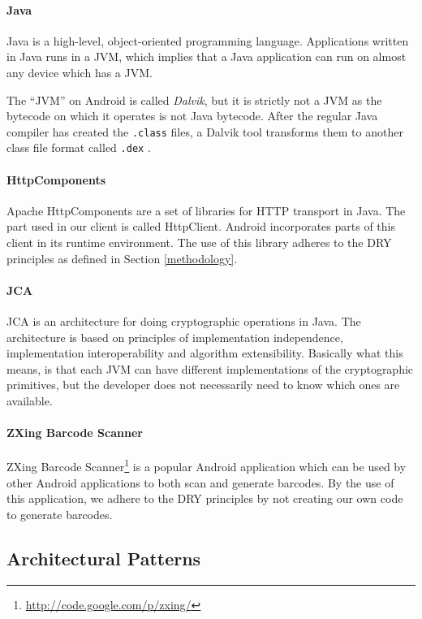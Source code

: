 \documentclass[pdftex,english,10pt,b5paper,twoside]{book}
\begin{document}
\paragraph{Java} Java is a high-level, object-oriented programming language.
Applications written in Java runs in a \ac{JVM}, which implies that a Java
application can run on almost any device which has a \ac{JVM}.

The ``\ac{JVM}'' on Android is called \emph{Dalvik}, but it is strictly not a
\acl{JVM} as the bytecode on which it operates is not Java bytecode.
After the regular Java compiler has created the \texttt{.class} files, a Dalvik
tool transforms them to another class file format called \texttt{.dex}
\cite{dalvik}.

\paragraph{HttpComponents} Apache HttpComponents are a set of libraries for
\ac{HTTP} transport in Java. The part used in our client is called HttpClient.
Android incorporates parts of this client in its runtime environment. The use
of this library adheres to the \ac{DRY} principles as defined in Section
\ref{methodology}.

\paragraph{\ac{JCA}} \ac{JCA} is an architecture for doing cryptographic
operations in Java. The architecture is based on principles of implementation
independence, implementation interoperability and algorithm extensibility.
Basically what this means, is that each \ac{JVM} can have different
implementations of the cryptographic primitives, but the developer does not
necessarily need to know which ones are available.  

\paragraph{ZXing Barcode Scanner} ZXing Barcode Scanner\footnote
{\url{http://code.google.com/p/zxing/}} is a popular Android application which
can be used by other Android applications to both scan and generate barcodes.
By the use of this application, we adhere to the \ac{DRY} principles by not
creating our own code to generate barcodes.

\subsection{Architectural Patterns}
\end{document}
